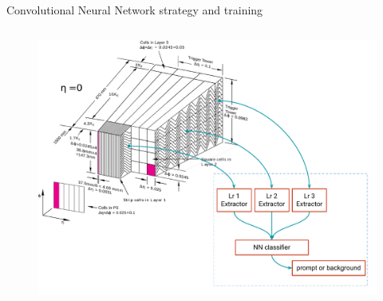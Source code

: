 \begin{frame}{Convolutional Neural Network strategy and training}
\begin{columns}
\begin{figure}
    \begin{overprint}
    \centering\includegraphics[width=1.1\textwidth]{Part6/Img/CNN_Idea2.pdf}
    \centering{}
    \end{overprint}
\end{figure}
\end{columns}
\end{frame}

